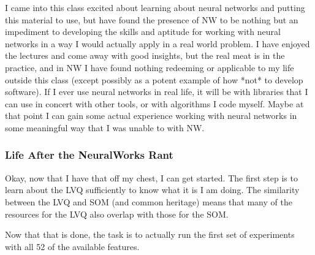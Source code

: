 \documentclass[12pt]{article}
\begin{document}
I came into this class excited about learning about neural networks and putting this material to use, but have found the presence of NW to be nothing but an impediment to developing the skills and aptitude for working with neural networks in a way I would actually apply in a real world problem.  I have enjoyed the lectures and come away with good insights, but the real meat is in the practice, and in NW I have found nothing redeeming or applicable to my life outside this class (except possibly as a potent example of how *not* to develop software).  If I ever use neural networks in real life, it will be with libraries that I can use in concert with other tools, or with algorithms I code myself.  Maybe at that point I can gain some actual experience working with neural networks in some meaningful way that I was unable to with NW.

\subsubsection{Life After the NeuralWorks Rant}

Okay, now that I have that off my chest, I can get started.  The first step is to learn about the LVQ sufficiently to know what it is I am doing.  The similarity between the LVQ and SOM (and common heritage) means that many of the resources for the LVQ also overlap with those for the SOM.  

Now that that is done, the task is to actually run the first set of experiments with all 52 of the available features.  
\end{document}
